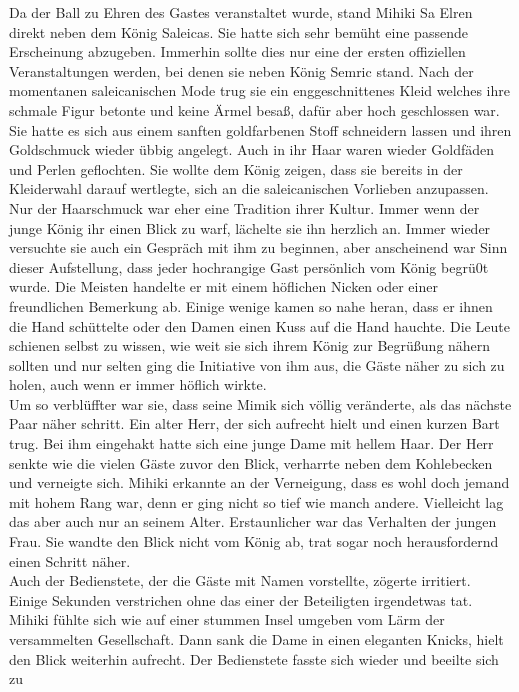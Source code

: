 Da der Ball zu Ehren des Gastes veranstaltet wurde, stand Mihiki Sa Elren direkt neben dem König 
Saleicas. Sie hatte sich sehr bemüht eine passende Erscheinung abzugeben. Immerhin sollte dies nur 
eine der ersten offiziellen Veranstaltungen werden, bei denen sie neben König Semric stand. Nach 
der momentanen saleicanischen Mode trug sie ein enggeschnittenes Kleid welches ihre schmale Figur 
betonte und keine Ärmel besaß, dafür aber hoch geschlossen war. Sie hatte es sich aus einem sanften 
goldfarbenen Stoff schneidern lassen und ihren Goldschmuck wieder übbig angelegt. Auch in ihr Haar 
waren wieder Goldfäden und Perlen geflochten. Sie wollte dem König zeigen, dass sie bereits in der 
Kleiderwahl darauf wertlegte, sich an die saleicanischen Vorlieben anzupassen. Nur der Haarschmuck 
war eher eine Tradition ihrer Kultur. Immer wenn der junge König ihr einen Blick zu warf, lächelte 
sie ihn herzlich an. Immer wieder versuchte sie auch ein Gespräch mit ihm zu beginnen, aber 
anscheinend war Sinn dieser Aufstellung, dass jeder hochrangige Gast persönlich vom König 
begrü0t wurde. Die Meisten handelte er mit einem höflichen Nicken oder einer freundlichen Bemerkung 
ab. Einige wenige kamen so nahe heran, dass er ihnen die Hand schüttelte oder den Damen einen Kuss 
auf die Hand hauchte. Die Leute schienen selbst zu wissen, wie weit sie sich ihrem König zur 
Begrüßung nähern sollten und nur selten ging die Initiative von ihm aus, die Gäste näher zu sich zu 
holen, auch wenn er immer höflich wirkte.\\
Um so verblüffter war sie, dass seine Mimik sich völlig veränderte, als das nächste Paar näher 
schritt. Ein alter Herr, der sich aufrecht hielt und einen kurzen Bart trug. Bei ihm eingehakt 
hatte sich eine junge Dame mit hellem Haar. Der Herr senkte wie die vielen Gäste zuvor den Blick, 
verharrte neben dem Kohlebecken und verneigte sich. Mihiki erkannte an der Verneigung, dass es wohl 
doch jemand mit hohem Rang war, denn er ging nicht so tief wie manch andere. Vielleicht lag das 
aber auch nur an seinem Alter. Erstaunlicher war das Verhalten der jungen Frau. Sie wandte den 
Blick nicht vom König ab, trat sogar noch herausfordernd einen Schritt näher.\\
Auch der Bedienstete, der die Gäste mit Namen vorstellte, zögerte irritiert. Einige Sekunden 
verstrichen ohne das einer der Beteiligten irgendetwas tat. Mihiki fühlte sich wie auf einer 
stummen Insel umgeben vom Lärm der versammelten Gesellschaft. Dann sank die Dame in einen eleganten 
Knicks, hielt den Blick weiterhin aufrecht. Der Bedienstete fasste sich wieder und beeilte sich zu 
